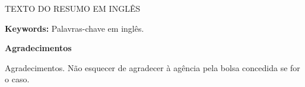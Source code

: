 \documentclass[brazil,12pt,a4paper,openany]{book}
\begin{document}
TEXTO DO RESUMO EM INGLÊS

\vspace{15pt}

\textbf{Keywords:} Palavras-chave em inglês.





\newpage

\noindent

\vspace*{20pt}

\begin{center}

{\LARGE\bf Agradecimentos}

\end{center}

\vspace*{40pt}

Agradecimentos.
Não esquecer de agradecer à agência pela bolsa concedida se for o caso.






\newpage
{}
{}
\tableofcontents



\printnomenclature

\newpage
{}
{}
\listoffigures

\mainmatter










\newpage
{}



%










\appendix

%

\end{document}
